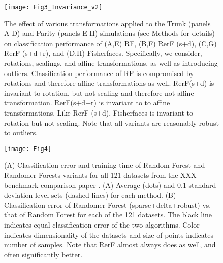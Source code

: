 \documentclass{article} %
\begin{document}
\begin{figure}[h]
\begin{center}
\texttt{[image: Fig3\_Invariance\_v2]}
\end{center}
\caption{The effect of various transformations applied to the Trunk (panels A-D) and Parity (panels E-H) simulations (see Methods for details) on classification performance of (A,E) RF, (B,F) RerF (s+d), (C,G) RerF (s+d+r), and (D,H) Fisherfaces. Specifically, we consider, rotations, scalings, and affine transformations, as well as introducing outliers. Classification performance of RF is compromised by rotations and therefore affine transformations as well. RerF(s+d) is invariant to rotation, but not scaling and therefore not affine transformation. RerF(s+d+r) is invariant to to affine transformations. Like RerF (s+d), Fisherfaces is invariant to rotation but not scaling. Note that all variants are reasonably robust to outliers.}
\end{figure}

\begin{figure}[h]
\begin{center}
\texttt{[image: Fig4]}
\end{center}
\caption{(A) Classification error and training time of Random Forest and Randomer Forests variants for all 121 datasets from the XXX benchmark comparison paper \cite{???}. (A) Average (dots) and 0.1 standard deviation level sets (dashed lines) for each method. (B) Classification error of Randomer Forest (sparse+delta+robust) vs. that of Random Forest for each of the 121 datasets. The black line indicates equal classification error of the two algorithms. Color indicates dimensionality of the datasets and size of points indicates number of samples. Note that RerF almost always does as well, and often significantly better.}
\end{figure}
\end{document}
